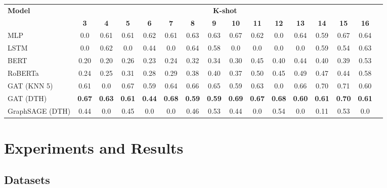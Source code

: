 \documentclass[conference]{IEEEtran}
\begin{document}
\begin{table*}[t]
    \setlength{\tabcolsep}{4pt}
    \centering
    \label{tab:politifact_results}
    \begin{tabular}{l|ccccccccccccccc}
    \hline
    \multirow{2}{*}{\textbf{Model}} & \multicolumn{14}{c}{\textbf{K-shot}} \\
    \cline{2-15}
     & \textbf{3} & \textbf{4} & \textbf{5} & \textbf{6} & \textbf{7} & \textbf{8} & \textbf{9} & \textbf{10} & \textbf{11} & \textbf{12} & \textbf{13} & \textbf{14} & \textbf{15} & \textbf{16} \\
    \hline
    MLP & 0.0 & 0.61 & 0.61 & 0.62 & 0.61 & 0.63 & 0.63 & 0.67 & 0.62 & 0.0 & 0.64 & 0.59 & 0.67 & 0.64 \\
    LSTM & 0.0 & 0.62 & 0.0 & 0.44 & 0.0 & 0.64 & 0.58 & 0.0 & 0.0 & 0.0 & 0.0 & 0.59 & 0.54 & 0.63 \\
    BERT & 0.20 & 0.20 & 0.26 & 0.23 & 0.24 & 0.32 & 0.34 & 0.30 & 0.45 & 0.40 & 0.44 & 0.40 & 0.39 & 0.53 \\
    RoBERTa & 0.24 & 0.25 & 0.31 & 0.28 & 0.29 & 0.38 & 0.40 & 0.37 & 0.50 & 0.45 & 0.49 & 0.47 & 0.44 & 0.58 \\
    \hline
    GAT (KNN 5) & 0.61 & 0.0 & 0.67 & 0.59 & 0.64 & 0.66 & 0.65 & 0.59 & 0.63 & 0.0 & 0.66 & 0.70 & 0.71 & 0.60 \\
    GAT (DTH) & \textbf{0.67} & \textbf{0.63} & \textbf{0.61} & \textbf{0.44} & \textbf{0.68} & \textbf{0.59} & \textbf{0.59} & \textbf{0.69} & \textbf{0.67} & \textbf{0.68} & \textbf{0.60} & \textbf{0.61} & \textbf{0.70} & \textbf{0.61} \\
    GraphSAGE (DTH)& 0.44 & 0.0 & 0.45 & 0.0 & 0.0 & 0.46 & 0.53 & 0.44 & 0.0 & 0.54 & 0.0 & 0.11 & 0.53 & 0.0 \\
    \hline
    \end{tabular}
\end{table*}
    


\section{Experiments and Results}
\label{sec:experiments}

\subsection{Datasets}
\label{subsec:datasets}
\end{document}

